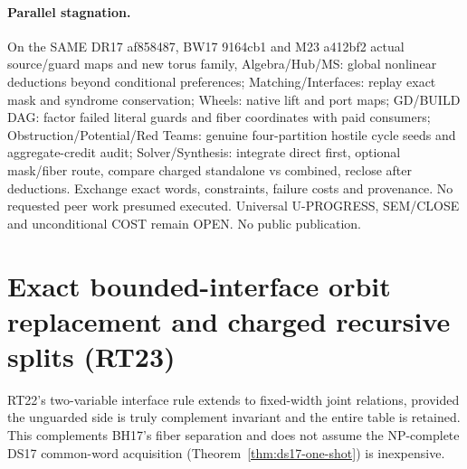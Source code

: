 \documentclass[11pt]{article}
\begin{document}
\paragraph{Parallel stagnation.} On the SAME DR17 af858487, BW17 9164cb1 and M23 a412bf2 actual source/guard maps and new torus family, Algebra/Hub/MS: global nonlinear deductions beyond conditional preferences; Matching/Interfaces: replay exact mask and syndrome conservation; Wheels: native lift and port maps; GD/BUILD DAG: factor failed literal guards and fiber coordinates with paid consumers; Obstruction/Potential/Red Teams: genuine four-partition hostile cycle seeds and aggregate-credit audit; Solver/Synthesis: integrate direct first, optional mask/fiber route, compare charged standalone vs combined, reclose after deductions. Exchange exact words, constraints, failure costs and provenance. No requested peer work presumed executed. Universal U-PROGRESS, SEM/CLOSE and unconditional COST remain OPEN. No public publication.


\section{Exact bounded-interface orbit replacement and charged recursive splits (RT23)}\label{sec:rt23}
RT22's two-variable interface rule extends to fixed-width joint relations, provided the unguarded side is truly complement invariant and the entire table is retained. This complements BH17's fiber separation and does not assume the NP-complete DS17 common-word acquisition (Theorem~\ref{thm:ds17-one-shot}) is inexpensive.
\end{document}
